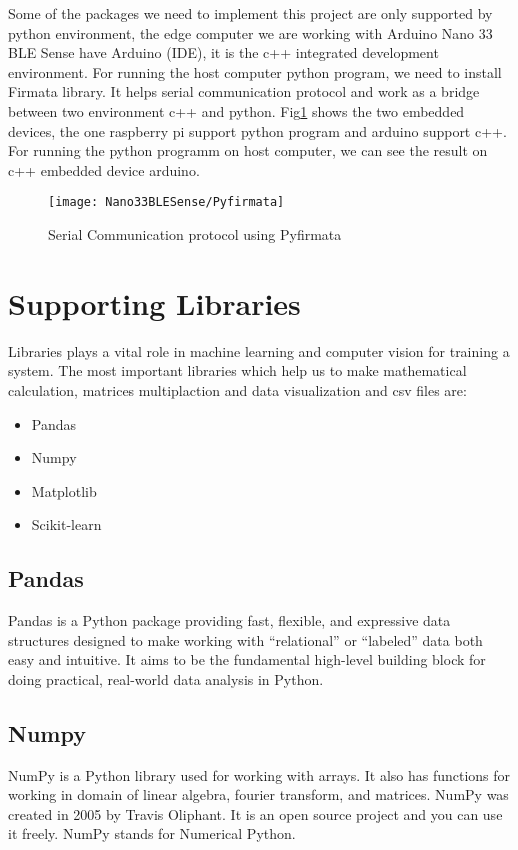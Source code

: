{Some of the packages we need to implement this project are only supported by python environment, the edge computer we are working with Arduino Nano 33 BLE Sense have Arduino (IDE), it is the c++ integrated development environment. For running the host computer python program, we need to install Firmata library. It helps serial communication protocol and work as a bridge between two environment c++ and python. Fig\ref{Serial Communication protocol using Pyfirmata} shows the two embedded devices, the one raspberry pi support python program and arduino support c++. For running the python programm on host computer, we can see the result on c++ embedded device arduino. 
\begin{figure}[h]
	\centering
	\texttt{[image: Nano33BLESense/Pyfirmata]}
	\caption{Serial Communication protocol using Pyfirmata}
	\label{Serial Communication protocol using Pyfirmata}
\end{figure}
\section {Supporting Libraries}
Libraries plays a vital role in machine learning and computer vision for training a system. The most important libraries which help us to make mathematical calculation, matrices multiplaction and data visualization and csv files are:
\begin{itemize}
	\item Pandas
	\item Numpy
	\item Matplotlib
	\item Scikit-learn
\end{itemize}
\subsection{Pandas}
Pandas is a Python package providing fast, flexible, and expressive data structures designed to make working with “relational” or “labeled” data both easy and intuitive. It aims to be the fundamental high-level building block for doing practical, real-world data analysis in Python.
\subsection{Numpy}
NumPy is a Python library used for working with arrays. It also has functions for working in domain of linear algebra, fourier transform, and matrices. NumPy was created in 2005 by Travis Oliphant. It is an open source project and you can use it freely. NumPy stands for Numerical Python.
}
